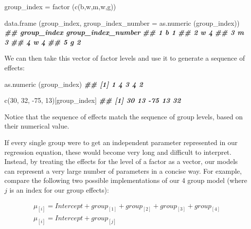 \documentclass[
]{book}
\newenvironment{Shaded}{\begin{snugshade}}{\end{snugshade}}
\newcommand{\AttributeTok}[1]{\textcolor[rgb]{0.77,0.63,0.00}{#1}}
\newcommand{\DecValTok}[1]{\textcolor[rgb]{0.00,0.00,0.81}{#1}}
\newcommand{\DocumentationTok}[1]{\textcolor[rgb]{0.56,0.35,0.01}{\textbf{\textit{#1}}}}
\newcommand{\FunctionTok}[1]{\textcolor[rgb]{0.00,0.00,0.00}{#1}}
\newcommand{\NormalTok}[1]{#1}
\newcommand{\OtherTok}[1]{\textcolor[rgb]{0.56,0.35,0.01}{#1}}
\newcommand{\SpecialCharTok}[1]{\textcolor[rgb]{0.00,0.00,0.00}{#1}}
\newcommand{\StringTok}[1]{\textcolor[rgb]{0.31,0.60,0.02}{#1}}
\begin{document}
\begin{Shaded}
\begin{Highlighting}[]
\NormalTok{group\_index }\OtherTok{=} \FunctionTok{factor}\NormalTok{ (}\FunctionTok{c}\NormalTok{(}\StringTok{\textquotesingle{}b\textquotesingle{}}\NormalTok{,}\StringTok{\textquotesingle{}w\textquotesingle{}}\NormalTok{,}\StringTok{\textquotesingle{}m\textquotesingle{}}\NormalTok{,}\StringTok{\textquotesingle{}w\textquotesingle{}}\NormalTok{,}\StringTok{\textquotesingle{}g\textquotesingle{}}\NormalTok{))}

\FunctionTok{data.frame}\NormalTok{ (group\_index, }\AttributeTok{group\_index\_number =} \FunctionTok{as.numeric}\NormalTok{ (group\_index))}
\DocumentationTok{\#\#   group\_index group\_index\_number}
\DocumentationTok{\#\# 1           b                  1}
\DocumentationTok{\#\# 2           w                  4}
\DocumentationTok{\#\# 3           m                  3}
\DocumentationTok{\#\# 4           w                  4}
\DocumentationTok{\#\# 5           g                  2}
\end{Highlighting}
\end{Shaded}

We can then take this vector of factor levels and use it to generate a sequence of effects:

\begin{Shaded}
\begin{Highlighting}[]
\FunctionTok{as.numeric}\NormalTok{ (group\_index)}
\DocumentationTok{\#\# [1] 1 4 3 4 2}

\FunctionTok{c}\NormalTok{(}\DecValTok{30}\NormalTok{, }\DecValTok{32}\NormalTok{, }\SpecialCharTok{{-}}\DecValTok{75}\NormalTok{, }\DecValTok{13}\NormalTok{)[group\_index]}
\DocumentationTok{\#\# [1]  30  13 {-}75  13  32}
\end{Highlighting}
\end{Shaded}

Notice that the sequence of effects match the sequence of group levels, based on their numerical value.

If every single group were to get an independent parameter represented in our regression equation, these would become very long and difficult to interpret. Instead, by treating the effects for the level of a factor as a vector, our models can represent a very large number of parameters in a concise way. For example, compare the following two possible implementations of our 4 group model (where \(j\) is an index for our group effects):

\begin{equation}
\begin{split}
\mu_{[i]} = Intercept + group_{[1]} + group_{[2]} + group_{[3]} + group_{[4]} \\
\mu_{[i]} = Intercept + group_{[j]} \\
\end{split}
\label{eq:40}
\end{equation}
\end{document}

